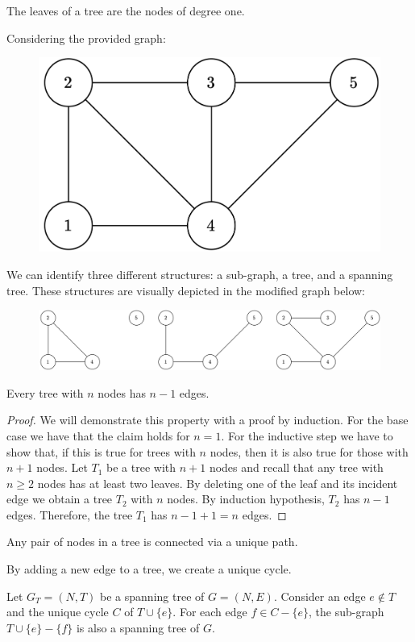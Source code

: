 \begin{definition}
    The leaves of a tree are the nodes of degree one. 
\end{definition}
\begin{example}
    Considering the provided graph:
    \begin{figure}[H]
        \centering
        \includegraphics[width=0.3\linewidth]{images/sgraph.png}
    \end{figure}
    We can identify three different structures: a sub-graph, a tree, and a spanning tree. 
    These structures are visually depicted in the modified graph below:
    \begin{figure}[H]
        \centering
        \includegraphics[width=0.8\linewidth]{images/sgraphmod.png}
    \end{figure}
\end{example}
\begin{property}
    Every tree with $n$ nodes has $n-1$ edges. 
\end{property}
\begin{proof}
    We will demonstrate this property with a proof by induction. 
    For the base case we have that the claim holds for $n=1$. 
    For the inductive step we have to show that, if this is true for trees with $n$ nodes, then it is also true for those with $n+1$ nodes. 
    Let $T_1$ be a tree with $n+1$ nodes and recall that any tree with $n \geq 2$ nodes has at least two leaves. 
    By deleting one of the leaf and its incident edge we obtain a tree $T_2$ with $n$ nodes. 
    By induction hypothesis, $T_2$ has $n-1$ edges. 
    Therefore, the tree $T_1$ has $n-1+1=n$ edges. 
\end{proof}
\begin{property}
    Any pair of nodes in a tree is connected via a unique path. 
\end{property}
\begin{property}
    By adding a new edge to a tree, we create a unique cycle. 
\end{property}
\begin{property}
    Let $G_T=(N,T)$ be a spanning tree of $G=(N,E)$. 
    Consider an edge $e \notin T$ and the unique cycle $C$ of $T \cup \{e\}$. 
    For each edge $f \in C-\{e\}$, the sub-graph $T\cup \{e\}-\{f\}$ is also a spanning tree of $G$. 
\end{property}